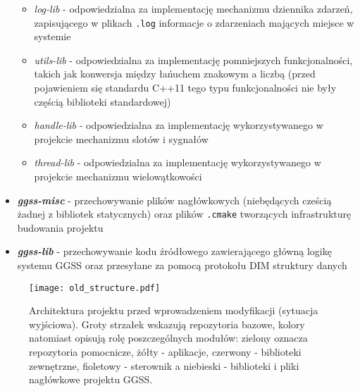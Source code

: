 \begin{itemize}
    \begin{itemize}
        \item \emph{log-lib} - odpowiedzialna za implementację mechanizmu dziennika zdarzeń, zapisującego w plikach \lstinline{.log} informacje o zdarzeniach mających miejsce w systemie
        \item \emph{utils-lib} - odpowiedzialna za implementację pomniejszych funkcjonalności, takich jak konwersja między łańuchem znakowym a liczbą (przed pojawieniem się standardu C++11 tego typu funkcjonalności nie były częścią biblioteki standardowej)
        \item \emph{handle-lib} - odpowiedzialna za implementację wykorzystywanego w projekcie mechanizmu slotów i sygnałów
        \item \emph{thread-lib} - odpowiedzialna za implementację wykorzystywanego w projekcie mechanizmu wielowątkowości
    \end{itemize}
    \item \textbf{\emph{ggss-misc}} - przechowywanie plików nagłówkowych (niebędących cześcią żadnej z bibliotek statycznych) oraz plików \lstinline{.cmake} tworzących infrastrukturę budowania projektu
    \item \textbf{\emph{ggss-lib}} - przechowywanie kodu źródłowego zawierającego główną logikę systemu GGSS oraz przesyłane za pomocą protokołu DIM struktury danych
\end{itemize}

\begin{figure}[H]
\centering
\texttt{[image: old\_structure.pdf]}
\caption{Architektura projektu przed wprowadzeniem modyfikacji (sytuacja wyjściowa). Groty strzałek wskazują repozytoria bazowe, kolory natomiast opisują rolę poszczególnych modułów: zielony oznacza repozytoria pomocnicze, żółty - aplikacje, czerwony - biblioteki zewnętrzne, fioletowy - sterownik a niebieski - biblioteki i pliki nagłówkowe projektu GGSS.}
\label{fig:old_structure}
\end{figure}

